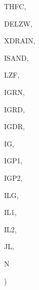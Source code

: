 {\begin{DoxyParamCaption}
\item[{real, dimension  (ilg,ig)}]{T\+H\+F\+C, }
\item[{real, dimension (ilg,ig)}]{D\+E\+L\+Z\+W, }
\item[{real, dimension(ilg)}]{X\+D\+R\+A\+I\+N, }
\item[{integer, dimension (ilg,ig)}]{I\+S\+A\+N\+D, }
\item[{integer, dimension   (ilg)}]{L\+Z\+F, }
\item[{integer, dimension  (ilg)}]{I\+G\+R\+N, }
\item[{integer, dimension  (ilg)}]{I\+G\+R\+D, }
\item[{integer, dimension  (ilg)}]{I\+G\+D\+R, }
\item[{integer}]{I\+G, }
\item[{integer}]{I\+G\+P1, }
\item[{integer}]{I\+G\+P2, }
\item[{integer}]{I\+L\+G, }
\item[{integer}]{I\+L1, }
\item[{integer}]{I\+L2, }
\item[{integer}]{J\+L, }
\item[{integer}]{N}
\end{DoxyParamCaption}
)}\label{GRDRAN_8f_a9d02aa9115635af052981eec146b1042}

